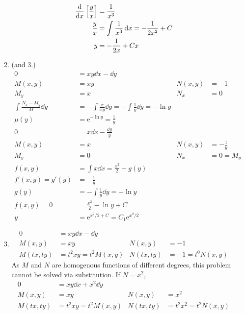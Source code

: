 \documentclass[12pt, A4]{article}
\newcommand{\en}{\text{e}}
\begin{document}
\begin{enumerate}[Q1]
\begin{enumerate}[1.]
{\begin{align*}
							\dv{x}\left[\frac{y}{x}\right] &= \frac{1}{x^3} \\
							\frac{y}{x} &= \int \frac{1}{x^3} \dd{x} 
									= -\frac{1}{2x^2} + C \\
							y &= -\frac{1}{2x} + Cx
						\end{align*}
				}
				\item (and 3.)
					\begin{align*}
						0 &= xy\dd{x} - \dd{y} \\
						M(x, y) &= xy &
							N(x, y) &= -1 \\
						M_y &= x &
							N_x &= 0 \\
						\int \frac{N_x - M_y}{M} \dd{y}
							&= -\int \frac{x}{xy} \dd{y}
								= -\int \frac{1}{y} \dd{y}
								= -\ln y \\
						\mu(y) &= \en^{-\ln y}
								= \frac{1}{y} \\
						0 &= x\dd{x} - \frac{\dd{y}}{y} \\
						M(x, y) &= x &
							N(x, y) &= -\frac{1}{y} \\
						M_y &= 0 &
							N_x &= 0 = M_y \\
						f(x, y) &= \int x \dd{x}
								= \frac{x^2}{2} + g(y) \\
						f'(x, y) = g'(y) &= -\frac{1}{y} \\
						g(y) &= -\int \frac{1}{y} \dd{y} 
								= -\ln y \\
						f(x, y) = 0 &= \frac{x^2}{2} - \ln y + C \\
						y &= \en^{x^2/2 + C}
							= C_1\en^{x^2/2}
					\end{align*}
				\setcounter{enumii}{3}
				\item
					\begin{align*}
						0 &= xy\dd{x} - \dd{y} \\
						M(x, y) &= xy &
							N(x, y) &= -1 \\
							M(tx, ty) &= t^2xy
									= t^2M(x, y) &
								N(tx, ty) &= -1
									= t^0N(x, y)
					\end{align*}
					As \(M\) and \(N\) are homogenous functions of different degrees, this problem cannot be solved via substitution. If \(N = x^2\),
					\begin{align*}
						0 &= xy\dd{x} + x^2\dd{y} \\
						M(x, y) &= xy &
							N(x, y) &= x^2 \\
							M(tx, ty) &= t^2xy
									= t^2M(x, y) &
								N(tx, ty) &= t^2x^2
									= t^2N(x, y) \\

\end{align*}
\end{enumerate}
\end{enumerate}
\end{document}
